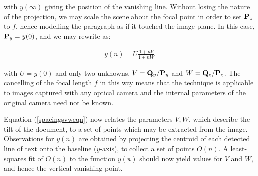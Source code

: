 {\parindent 0mm
with $y(\infty)$ giving the position of the vanishing line.
Without losing the nature of the projection, we may scale the scene about the focal point in order to set ${ \bf P }_z$ to $f$, hence modelling the paragraph as if it touched the image plane.  In this case, ${ \bf P }_y=y(0)$,
and we may rewrite  as:
}

\begin{eqnarray}
y(n) = U \frac{ 1 + nV }{ 1 + nW } \label{spacingsvweqn}
\end{eqnarray}

{ \parindent 0mm
with $U=y(0)$ and only two unknowns,
$V = {{ \bf Q }_y}/{{ \bf P }_y}$ and $W = {{ \bf Q }_z}/{{ \bf P }_z}$.
The cancelling of the focal length $f$ in this way means that the technique is applicable to images captured with any optical camera and the internal parameters of the original camera need not be known.

Equation (\ref{spacingsvweqn}) now relates the parameters $V,W$, which describe the
tilt of the document, to a set of points which may be extracted from the
image.
Observations for $y(n)$ are obtained by projecting the centroid of
each detected line of text onto the baseline ($y$-axis), to collect a set of
points $O(n)$.
A least-squares fit of $O(n)$ to the function $y(n)$ should now yield values for $V$ and $W$, and hence the vertical vanishing point.

}
